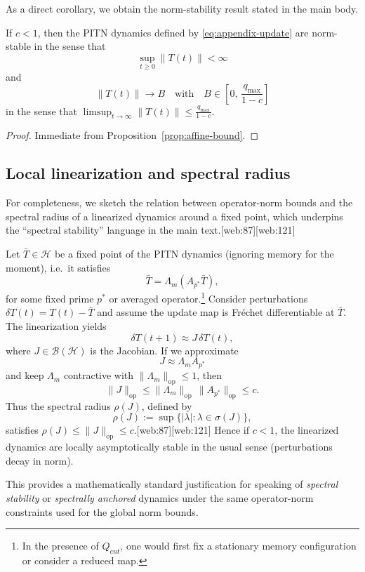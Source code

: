 \documentclass[11pt]{article}
\begin{document}
As a direct corollary, we obtain the norm-stability result stated in the main body.

\begin{corollary}\label{cor:local-stability}
If \( c < 1 \), then the PITN dynamics defined by \eqref{eq:appendix-update} are norm-stable in the sense that
\[
\sup_{t\ge 0} \|T(t)\| < \infty
\]
and
\[
\|T(t)\| \to B \quad\text{with}\quad B \in \left[0,\,\frac{q_{\max}}{1-c}\right]
\]
in the sense that \( \limsup_{t\to\infty} \|T(t)\| \le \frac{q_{\max}}{1-c} \).
\end{corollary}

\begin{proof}
Immediate from Proposition~\ref{prop:affine-bound}.
\end{proof}

\subsection{Local linearization and spectral radius}

For completeness, we sketch the relation between operator-norm bounds and the spectral radius of a linearized dynamics around a fixed point, which underpins the ``spectral stability'' language in the main text.[web:87][web:121]

Let \( \bar T \in \mathcal{H} \) be a fixed point of the PITN dynamics (ignoring memory for the moment), i.e.\ it satisfies
\[
\bar T = \Lambda_m(A_{p^\ast} \bar T),
\]
for some fixed prime \( p^\ast \) or averaged operator.\footnote{In the presence of \( Q_{ent} \), one would first fix a stationary memory configuration or consider a reduced map.} Consider perturbations \( \delta T(t) = T(t) - \bar T \) and assume the update map is Fréchet differentiable at \( \bar T \). The linearization yields
\[
\delta T(t+1) \approx J\,\delta T(t),
\]
where \( J \in \mathcal{B}(\mathcal{H}) \) is the Jacobian. If we approximate
\[
J \approx \Lambda_m A_{p^\ast}
\]
and keep \( \Lambda_m \) contractive with \( \|\Lambda_m\|_{\mathrm{op}} \le 1 \), then
\[
\|J\|_{\mathrm{op}} \le \|\Lambda_m\|_{\mathrm{op}} \,\|A_{p^\ast}\|_{\mathrm{op}} \le c.
\]
Thus the spectral radius \( \rho(J) \), defined by
\[
\rho(J) := \sup\{|\lambda| : \lambda \in \sigma(J)\},
\]
satisfies \( \rho(J) \le \|J\|_{\mathrm{op}} \le c \).[web:87][web:121] Hence if \( c < 1 \), the linearized dynamics are locally asymptotically stable in the usual sense (perturbations decay in norm).

This provides a mathematically standard justification for speaking of \emph{spectral stability} or \emph{spectrally anchored} dynamics under the same operator-norm constraints used for the global norm bounds.
\end{document}
